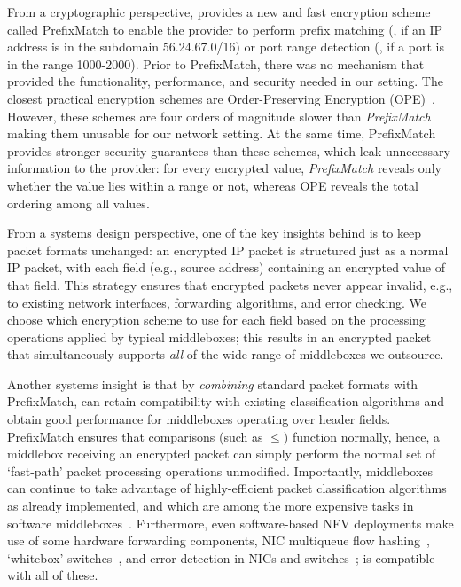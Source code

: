 From a cryptographic perspective, \sys provides a new and fast encryption scheme called PrefixMatch  to enable the provider to perform prefix matching (\eg{}, if an IP address is in the subdomain 56.24.67.0/16) or port range detection (\eg{}, if a port is in the range 1000-2000). Prior to PrefixMatch, there was no mechanism that provided the functionality, performance, and  security needed in our setting. The closest practical encryption schemes are Order-Preserving Encryption (OPE)~\cite{boldyreva:ope,popa:mope,popa:cryptdb}. 
However, these schemes are four orders of magnitude slower than {\it PrefixMatch} making them unusable for our network setting. At the same time, PrefixMatch provides stronger security guarantees than these schemes, which leak unnecessary information to the provider: for every encrypted value, {\em PrefixMatch} reveals only whether the value lies within a range or not, whereas OPE reveals the total ordering among all values.

  From a systems design perspective, one of the key insights behind \sys is to keep packet formats unchanged: an encrypted IP packet is structured just as a normal IP packet, with each field (e.g., source address) containing an encrypted value of that field.
  This strategy ensures that encrypted packets never appear invalid, e.g., to existing network interfaces, forwarding algorithms, and error checking. 
  We choose which encryption scheme to use for each field based on the processing operations applied by typical middleboxes; this results in an encrypted packet that simultaneously supports {\it all} of the wide range of middleboxes we outsource.
  
  Another systems insight is that by {\it combining} standard packet formats with PrefixMatch, \sys can retain compatibility with existing classification algorithms and obtain good performance for middleboxes operating over header fields.
  PrefixMatch ensures that comparisons (such as $\leq$) function normally, hence, a middlebox receiving an encrypted packet can simply perform the normal set of `fast-path' packet processing operations unmodified.
  Importantly, middleboxes can continue to take advantage of highly-efficient packet classification algorithms~\cite{packet_classif} as already implemented, and which are among the more expensive tasks in software middleboxes~\cite{comb, ethan-paper}.
  Furthermore, even software-based NFV deployments make use of some hardware forwarding components, \eg{} NIC multiqueue flow hashing~\cite{nicdocument}, `whitebox' switches~\cite{whitebox}, and error detection in NICs and switches~\cite{nicdocument, ciscov6}; \sys is compatible with all of these.

